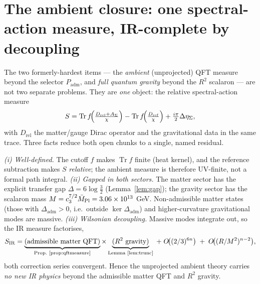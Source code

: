 \section{The ambient closure: one spectral-action measure, IR-complete by decoupling}
The two formerly-hardest items --- the \emph{ambient} (unprojected) QFT measure beyond the selector
$P_{\mathrm{adm}}$, and \emph{full quantum gravity} beyond the $R^2$ scalaron --- are not two separate
problems. They are \emph{one} object: the relative spectral-action measure
\[
  S=\operatorname{Tr}f\!\Bigl(\tfrac{D_{\mathrm{rel}}+A_\Sigma}{\chi}\Bigr)
    -\operatorname{Tr}f\!\Bigl(\tfrac{D_{\mathrm{ref}}}{\chi}\Bigr)+\tfrac{i\pi}{2}\Delta\eta_\Sigma ,
\]
with $D_{\mathrm{rel}}$ the matter/gauge Dirac operator and the gravitational data in the same trace.
Three facts reduce both open chunks to a single, named residual.

\begin{proposition}
\label{prop:ambient}
\emph{(i) Well-defined.} The cutoff $f$ makes $\operatorname{Tr}f$ finite (heat kernel), and the reference
subtraction makes $S$ \emph{relative}; the ambient measure is therefore UV-finite, not a formal path
integral. \emph{(ii) Gapped in both sectors.} The matter sector has the explicit transfer gap
$\Delta=6\log\tfrac32$ (Lemma~\ref{lem:gap}); the gravity sector has the scalaron mass
$M=c_3^{7/2}\bar M_{\mathrm{Pl}}=3.06\times10^{13}$ GeV. Non-admissible matter states (those with
$\Delta_{\mathrm{adm}}>0$, i.e.\ outside $\ker\Delta_{\mathrm{adm}}$) and higher-curvature gravitational
modes are massive. \emph{(iii) Wilsonian decoupling.} Massive modes integrate out, so the IR measure
factorises,
\[
  S_{\mathrm{IR}}=\underbrace{(\text{admissible matter QFT})}_{\text{Prop.~\ref{prop:qftmeasure}}}
  \times\underbrace{(R^2\ \text{gravity})}_{\text{Lemma~\ref{lem:trunc}}}
  \;+\;O\!\bigl((2/3)^{6n}\bigr)\;+\;O\!\bigl((R/M^2)^{n-2}\bigr),
\]
both correction series convergent. Hence the unprojected ambient theory carries \emph{no new IR physics}
beyond the admissible matter QFT and $R^2$ gravity.
\end{proposition}

